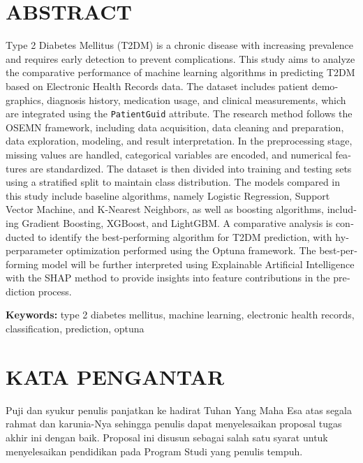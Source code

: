 \chapter*{ABSTRACT}
\begin{otherlanguage}{english}
Type 2 Diabetes Mellitus (T2DM) is a chronic disease with increasing prevalence and requires early detection to prevent complications. This study aims to analyze the comparative performance of machine learning algorithms in predicting T2DM based on Electronic Health Records data. The dataset includes patient demographics, diagnosis history, medication usage, and clinical measurements, which are integrated using the \texttt{PatientGuid} attribute. The research method follows the OSEMN framework, including data acquisition, data cleaning and preparation, data exploration, modeling, and result interpretation. In the preprocessing stage, missing values are handled, categorical variables are encoded, and numerical features are standardized. The dataset is then divided into training and testing sets using a stratified split to maintain class distribution. The models compared in this study include baseline algorithms, namely Logistic Regression, Support Vector Machine, and K-Nearest Neighbors, as well as boosting algorithms, including Gradient Boosting, XGBoost, and LightGBM. A comparative analysis is conducted to identify the best-performing algorithm for T2DM prediction, with hyperparameter optimization performed using the Optuna framework. The best-performing model will be further interpreted using Explainable Artificial Intelligence with the SHAP method to provide insights into feature contributions in the prediction process.

\noindent\textbf{Keywords:} type 2 diabetes mellitus, machine learning, electronic health records, classification, prediction, optuna
\end{otherlanguage}

\clearpage
\chapter*{KATA PENGANTAR}
Puji dan syukur penulis panjatkan ke hadirat Tuhan Yang Maha Esa atas segala rahmat dan karunia-Nya sehingga penulis dapat menyelesaikan proposal tugas akhir ini dengan baik. Proposal ini disusun sebagai salah satu syarat untuk menyelesaikan pendidikan pada Program Studi yang penulis tempuh.

